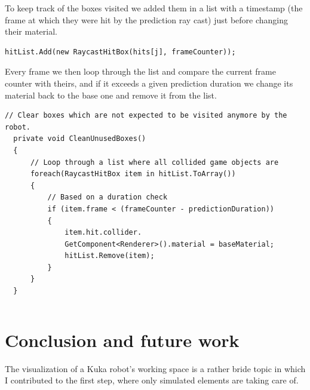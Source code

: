 \documentclass{scrartcl}
\begin{document}
To keep track of the boxes visited we added them in a list with a timestamp (the frame at which they were hit by the prediction ray cast) just before changing their material.

\begin{lstlisting}[language={[Sharp]C}]
  hitList.Add(new RaycastHitBox(hits[j], frameCounter));
\end{lstlisting}

Every frame we then loop through the list and compare the current frame counter with theirs, 
and if it exceeds a given prediction duration we change its material back to the base one and remove it from the list.

\begin{lstlisting}[language={[Sharp]C}]
  // Clear boxes which are not expected to be visited anymore by the robot.
  private void CleanUnusedBoxes()
  {
      // Loop through a list where all collided game objects are
      foreach(RaycastHitBox item in hitList.ToArray())
      {
          // Based on a duration check
          if (item.frame < (frameCounter - predictionDuration))
          {
              item.hit.collider.
              GetComponent<Renderer>().material = baseMaterial;
              hitList.Remove(item);
          }
      }
  }
\end{lstlisting}


\begin{lstlisting}[language={[Sharp]C}]
\end{lstlisting}

\clearpage

\section{Conclusion and future work}

The visualization of a Kuka robot’s working space is a rather bride topic in which I contributed to the first step, where only simulated elements are taking care of. 
\end{document}
